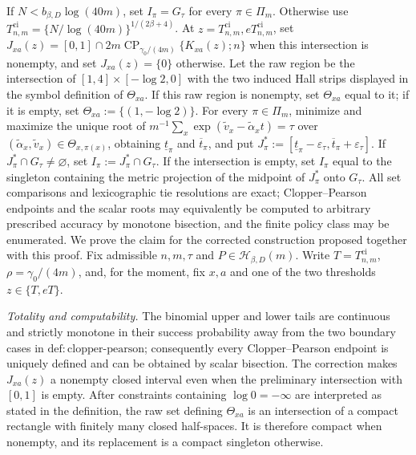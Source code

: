 If \(N<b_{\beta,D}\log(40m)\), set \(I_{\pi}=G_{\tau}\) for every \(\pi\in\Pi_m\). Otherwise use \(T^{\mathrm{ci}}_{n,m}=\{N/\log(40m)\}^{1/(2\beta+4)}\). At \(z=T^{\mathrm{ci}}_{n,m},eT^{\mathrm{ci}}_{n,m}\), set \(J_{xa}(z)=[0,1]\cap 2m\operatorname{CP}_{\gamma_0/(4m)}\{K_{xa}(z);n\}\) when this intersection is nonempty, and set \(J_{xa}(z)=\{0\}\) otherwise. Let the raw region be the intersection of \([1,4]\times[-\log2,0]\) with the two induced Hall strips displayed in the symbol definition of \(\Theta_{xa}\). If this raw region is nonempty, set \(\Theta_{xa}\) equal to it; if it is empty, set \(\Theta_{xa}:=\{(1,-\log2)\}\). For every \(\pi\in\Pi_m\), minimize and maximize the unique root of \(m^{-1}\sum_x\exp(\widetilde v_x-\widetilde\alpha_xt)=\tau\) over \((\widetilde\alpha_x,\widetilde v_x)\in\Theta_{x,\pi(x)}\), obtaining \(\underline t_{\pi}\) and \(\overline t_{\pi}\), and put \(J^*_{\pi}:=[\underline t_{\pi}-\varepsilon_{\tau},\overline t_{\pi}+\varepsilon_{\tau}]\). If \(J^*_{\pi}\cap G_{\tau}\neq\varnothing\), set \(I_{\pi}:=J^*_{\pi}\cap G_{\tau}\). If the intersection is empty, set \(I_{\pi}\) equal to the singleton containing the metric projection of the midpoint of \(J^*_{\pi}\) onto \(G_{\tau}\). All set comparisons and lexicographic tie resolutions are exact; Clopper--Pearson endpoints and the scalar roots may equivalently be computed to arbitrary prescribed accuracy by monotone bisection, and the finite policy class may be enumerated.
We prove the claim for the corrected construction proposed together with this proof.  Fix admissible \(n,m,\tau\) and \(P\in\mathcal H_{\beta,D}(m)\).  Write \(T=T^{\mathrm{ci}}_{n,m}\), \(\rho=\gamma _0/(4m)\), and, for the moment, fix \(x,a\) and one of the two thresholds \(z\in\{T,eT\}\).

\emph{Totality and computability.}  The binomial upper and lower tails are continuous and strictly monotone in their success probability away from the two boundary cases in \(\mathrm{def{:}clopper\text{-}pearson}\); consequently every Clopper--Pearson endpoint is uniquely defined and can be obtained by scalar bisection.  The correction makes \(J_{xa}(z)\) a nonempty closed interval even when the preliminary intersection with \([0,1]\) is empty.  After constraints containing \(\log0=-\infty\) are interpreted as stated in the definition, the raw set defining \(\Theta_{xa}\) is an intersection of a compact rectangle with finitely many closed half-spaces.  It is therefore compact when nonempty, and its replacement is a compact singleton otherwise.


